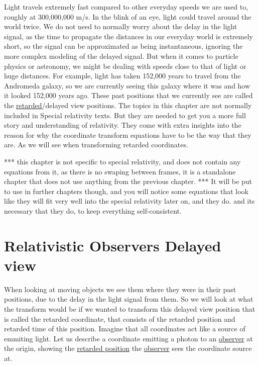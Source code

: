 Light travels extremely fast compared to other everyday speeds we are used to, roughly at 300,000,000 m/s.
In the blink of an eye, light could travel around the world twice.
We do not need to normally worry about the delay in the light signal, as the time to propagate the distances in our everyday world is extremely short, so the signal can be approximated as being instantaneous, ignoring the more complex modeling of the delayed signal.
But when it comes to particle physics or astronomy, we might be dealing with speeds close to that of light or huge distances.
For example, light has taken 152,000 years to travel from the Andromeda galaxy, so we are currently seeing this galaxy where it was and how it looked 152,000 years ago.
These past positions that we currently see are called the \hyperlink{def-retarded-position}{retarded}/delayed view positions.
The topics in this chapter are not normally included in Special relativity texts.
But they are needed to get you a more full story and understanding of relativity.
They come with extra insights into the reason for why the coordinate transform equations have to be the way that they are.
As we will see when transforming retarded coordinates.

*** this chapter is not specific to special relativity, and does not contain any equations from it, as there is no swaping between frames, it is a standalone chapter that does not use anything from the previous chapter.
*** It will be put to use in further chapters though, and you will notice some equations that look like they will fit very well into the special relativity later on, and they do. and its necessary that they do, to keep everything self-consistent.

\section{Relativistic Observers Delayed view} \label{sect: Relativistic Observers Delayed view}

When looking at moving objects we see them where they were in their past positions, due to the delay in the light signal from them.
So we will look at what the transform would be if we wanted to transform this delayed view position that is called the retarded coordinate, that consists of the retarded position and retarded time of this position.
Imagine that all coordinates act like a source of emmiting light.
Let us describe a coordinate emitting a photon to an \hyperlink{def-observer}{observer} at the origin, showing the \hyperlink{def-retarded-position}{retarded position} the \hyperlink{def-observer}{observer} sees the coordinate source at.

